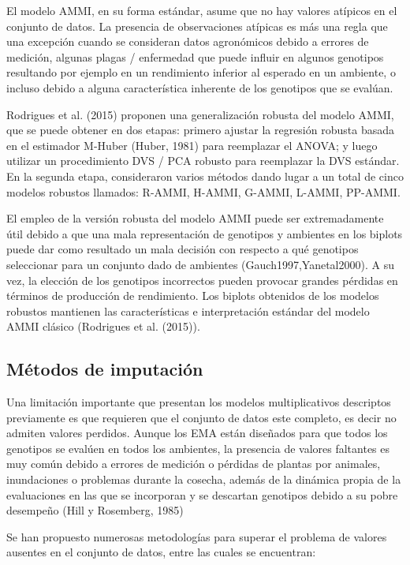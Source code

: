 El modelo AMMI, en su forma estándar, asume que no hay valores atípicos en el conjunto de datos. La presencia de observaciones atípicas es más una regla que una excepción cuando se consideran datos agronómicos debido a errores de medición, algunas plagas / enfermedad que puede influir en algunos genotipos  resultando por ejemplo en un rendimiento inferior al esperado en un ambiente, o incluso debido a alguna característica inherente de los genotipos que se evalúan.

Rodrigues et al. (2015) proponen una generalización robusta del modelo AMMI, que se puede obtener en dos etapas: primero ajustar la regresión robusta basada en el estimador M-Huber (Huber, 1981) para reemplazar el ANOVA; y luego utilizar un procedimiento DVS / PCA robusto para reemplazar la DVS estándar. En la segunda etapa, consideraron varios métodos dando lugar a un total de cinco modelos robustos llamados: R-AMMI, H-AMMI, G-AMMI, L-AMMI, PP-AMMI. 

El empleo de la versión robusta del modelo AMMI puede ser extremadamente útil debido a que una mala representación de genotipos y ambientes en los biplots puede dar como resultado un mala decisión con respecto a qué genotipos seleccionar para un conjunto dado de ambientes (Gauch1997,Yanetal2000). A su vez, la elección de los genotipos incorrectos pueden provocar grandes pérdidas en términos de producción de rendimiento. Los biplots obtenidos de los modelos robustos mantienen las características e interpretación estándar del modelo AMMI clásico (Rodrigues et al. (2015)).


\subsection{Métodos de imputación}


Una limitación importante que presentan los modelos multiplicativos descriptos previamente es que requieren que el conjunto de datos este completo, es decir no admiten valores perdidos. Aunque los EMA están diseñados para que todos los genotipos se evalúen en todos los ambientes, la presencia de valores faltantes es muy común debido a errores de medición o pérdidas de plantas por animales, inundaciones o problemas durante la cosecha, además de la dinámica propia de la evaluaciones en las que se incorporan y se descartan genotipos debido a su pobre desempeño (Hill y Rosemberg, 1985)

Se han propuesto numerosas metodologías para superar el problema de valores ausentes en el conjunto de datos, entre las cuales se encuentran:

